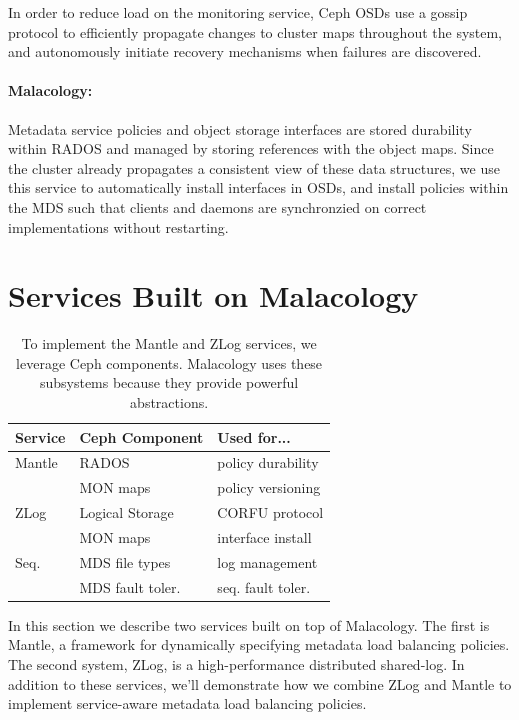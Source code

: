 \documentclass[10pt,twocolumn]{article}
\begin{document}
In order to reduce load on the monitoring service, Ceph OSDs use a gossip
protocol to efficiently propagate changes to cluster maps throughout the
system, and autonomously initiate recovery mechanisms when failures are
discovered.

\paragraph*{Malacology:} Metadata service policies and object storage interfaces are stored durability
within RADOS and managed by storing references with the object maps. Since
the cluster already propagates a consistent view of these data structures,
we use this service to automatically install interfaces in OSDs, and install
policies within the MDS such that clients and daemons are synchronzied on
correct implementations without restarting.



\section{Services Built on Malacology}\label{services-built-on-malacology}

\label{services}

\begin{table}
\centering
\begin{tabular}{  l | l | l    }
\textbf{Service} & \textbf{Ceph Component} & \textbf{Used for...}  \\ \hline
Mantle  & RADOS    & policy durability \\
        & MON maps & policy versioning \\ \hline
ZLog    & Logical Storage & CORFU protocol  \\ 
        & MON maps & interface install \\ \hline
Seq.    & MDS file types & log management \\ 
        & MDS fault toler. & seq. fault toler. \\
\end{tabular}
\caption{To implement the Mantle and ZLog services, we leverage Ceph components. Malacology uses these subsystems because they provide powerful abstractions.}
\label{table:implementation}
\end{table}

In this section we describe two services built on top of Malacology. The first
is Mantle, a framework for dynamically specifying metadata load balancing
policies. The second system, ZLog, is a high-performance distributed shared-log.
In addition to these services, we'll demonstrate how we combine ZLog and Mantle
to implement service-aware metadata load balancing policies.
\end{document}
